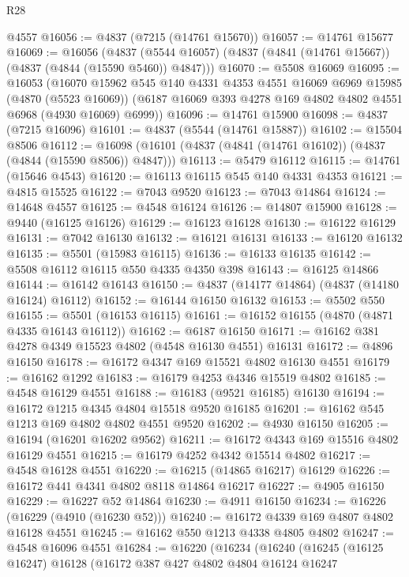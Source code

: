 \begin{lexlean}{R28}
\begin{coremodule}
    @4557
@16056 := @4837 (@7215 (@14761 @15670))
@16057 := @14761 @15677
@16069 := @16056
    (@4837 (@5544 @16057) (@4837 (@4841 (@14761 @15667)) (@4837 (@4844 (@15590 @5460)) @4847)))
@16070 := @5508 @16069
@16095 := @16053
    (@16070
      @15962
      @545
      @140
      @4331
      @4353
      @4551
      @16069
      @6969
      @15985
      (@4870 (@5523 @16069))
      (@6187 @16069 @393 @4278 @169 @4802 @4802 @4551 @6968 (@4930 @16069) @6999))
@16096 := @14761 @15900
@16098 := @4837 (@7215 @16096)
@16101 := @4837 (@5544 (@14761 @15887))
@16102 := @15504 @8506
@16112 := @16098 (@16101 (@4837 (@4841 (@14761 @16102)) (@4837 (@4844 (@15590 @8506)) @4847)))
@16113 := @5479 @16112
@16115 := @14761 (@15646 @4543)
@16120 := @16113 @16115 @545 @140 @4331 @4353
@16121 := @4815 @15525
@16122 := @7043 @9520
@16123 := @7043 @14864
@16124 := @14648 @4557
@16125 := @4548 @16124
@16126 := @14807 @15900
@16128 := @9440 (@16125 @16126)
@16129 := @16123 @16128
@16130 := @16122 @16129
@16131 := @7042 @16130
@16132 := @16121 @16131
@16133 := @16120 @16132
@16135 := @5501 (@15983 @16115)
@16136 := @16133 @16135
@16142 := @5508 @16112 @16115 @550 @4335 @4350 @398
@16143 := @16125 @14866
@16144 := @16142 @16143
@16150 := @4837 (@14177 @14864) (@4837 (@14180 @16124) @16112)
@16152 := @16144 @16150 @16132
@16153 := @5502 @550
@16155 := @5501 (@16153 @16115)
@16161 := @16152 @16155 (@4870 (@4871 @4335 @16143 @16112))
@16162 := @6187 @16150
@16171 := @16162 @381 @4278 @4349 @15523 @4802 (@4548 @16130 @4551) @16131
@16172 := @4896 @16150
@16178 := @16172 @4347 @169 @15521 @4802 @16130 @4551
@16179 := @16162 @1292
@16183 := @16179 @4253 @4346 @15519 @4802
@16185 := @4548 @16129 @4551
@16188 := @16183 (@9521 @16185) @16130
@16194 := @16172 @1215 @4345 @4804 @15518 @9520 @16185
@16201 := @16162 @545 @1213 @169 @4802 @4802 @4551 @9520
@16202 := @4930 @16150
@16205 := @16194 (@16201 @16202 @9562)
@16211 := @16172 @4343 @169 @15516 @4802 @16129 @4551
@16215 := @16179 @4252 @4342 @15514 @4802
@16217 := @4548 @16128 @4551
@16220 := @16215 (@14865 @16217) @16129
@16226 := @16172 @441 @4341 @4802 @8118 @14864 @16217
@16227 := @4905 @16150
@16229 := @16227 @52 @14864
@16230 := @4911 @16150
@16234 := @16226 (@16229 (@4910 (@16230 @52)))
@16240 := @16172 @4339 @169 @4807 @4802 @16128 @4551
@16245 := @16162 @550 @1213 @4338 @4805 @4802
@16247 := @4548 @16096 @4551
@16284 := @16220
    (@16234
      (@16240
        (@16245
          (@16125 @16247)
          @16128
          (@16172
            @387
            @427
            @4802
            @4804
            @16124
            @16247

\end{coremodule}
\end{lexlean}

